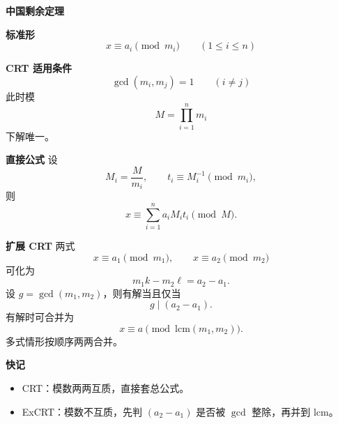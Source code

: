 \textbf{中国剩余定理}

\textbf{标准形}
\[
x\equiv a_i \pmod{m_i}\qquad (1\le i\le n)
\]

\textbf{CRT 适用条件}
\[
\gcd(m_i,m_j)=1\qquad (i\ne j)
\]
此时模
\[
M=\prod_{i=1}^n m_i
\]
下解唯一。

\textbf{直接公式}
设
\[
M_i=\frac{M}{m_i},\qquad t_i\equiv M_i^{-1}\pmod{m_i},
\]
则
\[
x\equiv \sum_{i=1}^n a_iM_it_i \pmod M.
\]

\textbf{扩展 CRT}
两式
\[
x\equiv a_1\pmod{m_1},\qquad x\equiv a_2\pmod{m_2}
\]
可化为
\[
m_1k-m_2\ell=a_2-a_1.
\]
设 $g=\gcd(m_1,m_2)$，则有解当且仅当
\[
g\mid (a_2-a_1).
\]
有解时可合并为
\[
x\equiv a \pmod{\mathrm{lcm}(m_1,m_2)}.
\]
多式情形按顺序两两合并。

\textbf{快记}
\begin{itemize}
\item CRT：模数两两互质，直接套总公式。
\item ExCRT：模数不互质，先判 $(a_2-a_1)$ 是否被 $\gcd$ 整除，再并到 $\mathrm{lcm}$。
\end{itemize}
